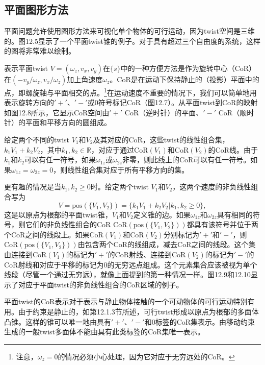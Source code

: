 \documentclass[12pt,a4paper]{article}
\begin{document}
\subsection{平面图形方法}
\label{subsec:planar_graphical_methods}

平面问题允许使用图形方法来可视化单个物体的可行运动，因为twist空间是三维的。图12.5显示了一个平面twist锥的例子。对于具有超过三个自由度的系统，这样的图将非常难以绘制。

表示平面twist $V = (\omega_z, v_x, v_y)$在$\{s\}$中的一种方便方法是作为旋转中心（CoR）在$(-v_y/\omega_z, v_x/\omega_z)$加上角速度$\omega_z$。CoR是在运动下保持静止的（投影）平面中的点，即螺旋轴与平面相交的点。\footnote{注意，$\omega_z = 0$的情况必须小心处理，因为它对应于无穷远处的CoR。}在运动速度不重要的情况下，我们可以简单地用表示旋转方向的$'+'$、$'-'$或$0$符号标记CoR（图12.7）。从平面twist到CoR的映射如图12.8所示，它显示CoR空间由$'+'$ CoR（逆时针）的平面、$'-'$ CoR（顺时针）的平面和平移方向的圆组成。

给定两个不同的twist $V_1$和$V_2$及其对应的CoR，这些twist的线性组合集，$k_1 V_1 + k_2 V_2$，其中$k_1, k_2 \in \mathbb{R}$，对应于通过$\text{CoR}(V_1)$和$\text{CoR}(V_2)$的CoR线。由于$k_1$和$k_2$可以有任一符号，如果$\omega_{1z}$或$\omega_{2z}$非零，则此线上的CoR可以有任一符号。如果$\omega_{1z} = \omega_{2z} = 0$，则线性组合集对应于所有平移方向的集。

更有趣的情况是当$k_1, k_2 \geq 0$时。给定两个twist $V_1$和$V_2$，这两个速度的非负线性组合写为
\begin{equation}
V = \text{pos}(\{V_1, V_2\}) = \{k_1 V_1 + k_2 V_2 | k_1, k_2 \geq 0\},
\end{equation}
这是以原点为根部的平面twist锥，$V_1$和$V_2$定义锥的边。如果$\omega_{1z}$和$\omega_{2z}$具有相同的符号，则它们的非负线性组合的CoR $\text{CoR}(\text{pos}(\{V_1, V_2\}))$都具有该符号并位于两个CoR之间的线段上。如果$\text{CoR}(V_1)$和$\text{CoR}(V_2)$分别标记为$'+'$和$'-'$，则$\text{CoR}(\text{pos}(\{V_1, V_2\}))$由包含两个CoR的线组成，减去CoR之间的线段。这个集由连接到$\text{CoR}(V_1)$的标记为$'+'$的CoR射线、连接到$\text{CoR}(V_2)$的标记为$'-'$的CoR射线和对应于平移的标记为$0$的无穷远点组成。这个元素集合应该被视为单个线段（尽管一个通过无穷远），就像上面提到的第一种情况一样。图12.9和12.10显示了对应于平面twist的非负线性组合的CoR区域的例子。

平面twist的CoR表示对于表示与静止物体接触的一个可动物体的可行运动特别有用。由于约束是静止的，如第12.1.3节所述，可行twist形成以原点为根部的多面体凸锥。这样的锥可以唯一地由具有$'+'$、$'-'$和$0$标签的CoR集表示。由移动约束生成的一般twist多面体不能由具有此类标签的CoR集唯一表示。
\end{document}
